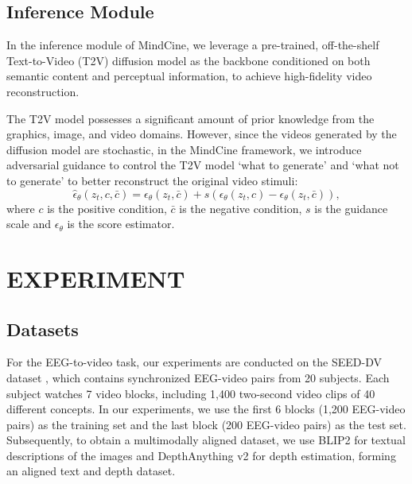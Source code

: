 \documentclass{article}
\begin{document}
\subsection{Inference Module}  
In the inference module of MindCine, we leverage a pre-trained, off-the-shelf Text-to-Video (T2V) diffusion model as the backbone conditioned on both semantic content and perceptual information, to achieve high-fidelity video reconstruction. 

The T2V model possesses a significant amount of prior knowledge from the graphics, image, and video domains. However, since the videos generated by the diffusion model are stochastic, in the MindCine  framework, we introduce adversarial guidance to control the T2V model `what to generate' and `what not to generate' to better reconstruct the original video stimuli:
\begin{equation}
    \hat{\epsilon}_{\theta}(z_t, c, \bar{c}) = \epsilon_{\theta}(z_t, \bar{c}) + s(\epsilon_{\theta}(z_t, c) - \epsilon_{\theta}(z_t, \bar{c})),
\end{equation}
where $c$ is the positive condition, $\bar{c}$ is the negative condition, $s$ is the guidance scale and $\epsilon_{\theta}$ is the score estimator. 





\section{EXPERIMENT}
\label{sec:exp}
\subsection{Datasets}
For the EEG-to-video task, our experiments are conducted on the SEED-DV dataset \cite{liu2024eeg2video}, which contains synchronized EEG-video pairs from 20 subjects. Each subject watches 7 video blocks, including 1,400 two-second video clips of 40 different concepts. In our experiments, we use the first 6 blocks (1,200 EEG-video pairs) as the training set and the last block (200 EEG-video pairs) as the test set. Subsequently, to obtain a multimodally aligned dataset, we use BLIP2 \cite{li2023blip} for textual descriptions of the images and DepthAnything v2\cite{depth_anything_v2} for depth estimation, forming an aligned text and depth dataset. 
\end{document}
